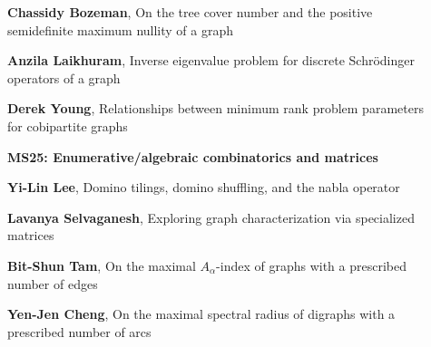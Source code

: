 \documentclass[ILAS2025-program.tex]{subfiles}
\begin{document}
\begin{description}
\begin{description}
        \item[] \textbf{Chassidy Bozeman}, On the tree cover number and the positive semidefinite maximum nullity of a graph
        \item[] \textbf{Anzila Laikhuram}, Inverse eigenvalue problem for discrete Schrödinger operators of a graph
        \item[] \textbf{Derek Young}, Relationships between minimum rank problem parameters for cobipartite graphs
        \end{description}
    \begin{description}
    \item[] {\color{mstitle}\textbf{MS25: Enumerative/algebraic combinatorics and matrices}} 
    \item[] \textbf{Yi-Lin Lee}, Domino tilings, domino shuffling, and the nabla operator
        \item[] \textbf{Lavanya Selvaganesh}, Exploring graph characterization via specialized matrices

        \item[] \textbf{Bit-Shun Tam}, On the maximal $A_\alpha$-index of graphs with a prescribed number of edges
        \item[] \textbf{Yen-Jen Cheng}, On the maximal spectral radius of digraphs with a prescribed number of arcs


\end{description}
\end{description}
\end{document}
